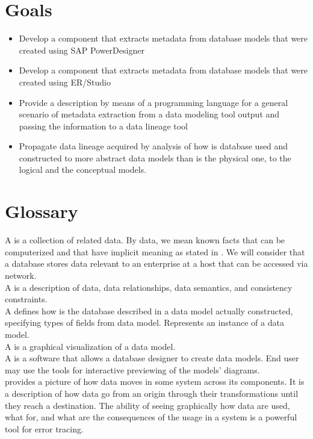 \section{Goals}

\begin{itemize}
	\item Develop a component that extracts metadata from database models that were created using SAP PowerDesigner 
	\item Develop a component that extracts metadata from database models that were created using ER/Studio
	\item Provide a description by means of a programming language for a general scenario of metadata extraction from a data modeling tool output and passing the information to a data lineage tool
	\item Propagate data lineage acquired by analysis of how is database used and constructed to more abstract data models than is the physical one, to the logical and the conceptual models.
\end{itemize}


\section{Glossary}
A  is a collection of related data. By data, we mean known facts that can be computerized and that have implicit meaning as stated in  \cite{ElmasryNavathe15}. We will consider that a database stores data relevant to an enterprise at a host that can be accessed via network. \\

A  is a description of data, data relationships, data semantics, and consistency constraints. \label{DataModel} \\
 
A  defines how is the database described in a data model actually constructed, specifying types of fields from data model. Represents an instance of a data model. \\

A  is a graphical visualization of a data model. \\

A  is a software that allows a database designer to create data models. End user may use the tools for interactive previewing of the models' diagrams. \\

 provides a picture of how data moves in some system across its components. It is a description of how data go from an origin through their transformations until they reach a destination. 
The ability of seeing graphically how data are used, what for, and what are the consequences of the usage in a system is a powerful tool for error tracing. \\

